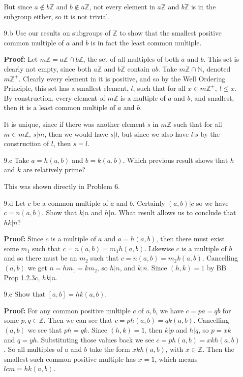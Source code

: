 \documentclass[letterpaper]{article}
\newcommand{\Integers}{\mathbb{Z}}
\newcommand{\Naturals}{\mathbb{N}}
\begin{document}
\begin{itemize}
            But since \(a \notin b\Integers\) and \(b \notin a\Integers\), not every element in \(a\Integers\) and \(b\Integers\) is in the subgroup either, so it is not trivial.

      \item[9.b] Use our results on subgroups of \(\Integers\) to show that the smallest positive common multiple of \(a\) and \(b\) is in fact the least common multiple.

            \textbf{Proof: } Let \(m\Integers = a\Integers \cap b\Integers\), the set of all multiples of both \(a\) and \(b\). This set is clearly not empty, since both \(a\Integers\) and \(b\Integers\) contain \(ab\). Take \(m\Integers \cap \Naturals\), denoted \(m\Integers^+\). Clearly every element in it is positive, and so by the Well Ordering Principle, this set has a smallest element, \(l\), such that for all \(x \in m\Integers^+,\ l \leq x\). By construction, every element of \(m\Integers\) is a multiple of \(a\) and \(b\), and smallest, then it is a least common multiple of \(a\) and \(b\).

            It is unique, since if there was another element \(s\) in \(m\Integers\) such that for all \(m \in m\Integers\), \(s | m\), then we would have \(s | l\), but since we also have \(l | s\) by the construction of \(l\), then \(s = l\).

      \item[9.c] Take \(a = h(a, b)\) and \(b = k(a, b)\). Which previous result shows that \(h\) and \(k\) are relatively prime?

            This was shown directly in Problem 6.

      \item[9.d] Let \(c\) be a common multiple of \(a\) and \(b\). Certainly \((a, b)|c\) so we have \(c = n(a, b)\). Show that \(k | n\) and \(h | n\). What result allows us to conclude that \(hk | n\)?

            \textbf{Proof: } Since \(c\) is a multiple of \(a\) and \(a = h(a,b)\), then there must exist some \(m_1\) such that \(c = n(a,b) = m_1h(a,b)\). Likewise \(c\) is a multiple of \(b\) and so there must be an \(m_2\) such that \(c = n(a,b) = m_2k(a,b)\). Cancelling \((a,b)\) we get \(n = hm_1 = km_2\), so \(h | n\), and \(k | n\). Since \((h, k) = 1\) by BB Prop 1.2.3c, \(hk | n\).

      \item[9.e] Show that \([a, b] = hk(a, b)\).

            \textbf{Proof: } For any common positive multiple \(c\) of \(a, b\), we have \(c = pa = qb\) for some \(p,q \in \Integers\).
            Then we can see that \(c = ph(a,b)= qk(a,b)\). Cancelling \((a,b)\) we see that \(ph = qk\). Since \((h,k) = 1\), then \(k | p\) and \(h | q\), so \(p = xk\) and \(q = yh\). Substituting those values back we see \(c = ph(a,b) = xkh(a,b)\). So all multiples of \(a\) and \(b\) take the form \(xkh(a,b)\), with \(x \in \Integers\). Then the smallest such common positive multiple has \(x = 1\), which means \(lcm = hk(a,b)\).



\end{itemize}
\end{document}

